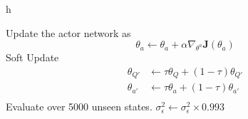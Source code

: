 \begin{algorithm}{h}
\begin{algorithmic}
                \State Update the actor network as \[ \theta_a \gets \theta_a + \alpha \nabla_{\theta^a} \mathbf{J}(\theta_a) \]
                \State Soft Update
                \begin{equation}
                    \begin{aligned}
                        \theta_{Q'} & \gets \tau \theta_Q + (1 - \tau) \theta_{Q'} \\
                        \theta_{a'} & \gets \tau \theta_a + (1 - \tau) \theta_{a'} \\
                    \end{aligned}
                \end{equation} 
                \State Evaluate over 5000 unseen states. 
            \EndFor
            \State $\sigma^2_\epsilon \gets \sigma^2_\epsilon \times 0.993$
        \EndFor
    \end{algorithmic}
\end{algorithm}